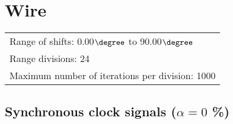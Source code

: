 \section{Wire}
\flushleft
\begin{tabular}[l]{l}

  Range of shifts: 0.00$\degree$ to 90.00$\degree$ \\
  Range divisions: 24\\
  Maximum number of iterations per division: 1000\\

\end{tabular}

\subsection{Synchronous clock signals ($\alpha=0$ \%)}

